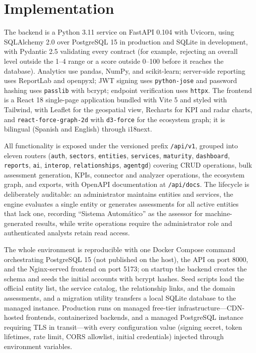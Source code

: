 \documentclass[runningheads]{llncs}
\begin{document}
\section{Implementation}
\label{sec:impl}

The backend is a Python 3.11 service on FastAPI 0.104 with Uvicorn, using
SQLAlchemy 2.0 over PostgreSQL 15 in production and SQLite in development,
with Pydantic 2.5 validating every contract (for example, rejecting an
overall level outside the 1--4 range or a score outside 0--100 before it
reaches the database). Analytics use pandas, NumPy, and scikit-learn;
server-side reporting uses ReportLab and openpyxl; JWT signing uses
\texttt{python-jose} and password hashing uses \texttt{passlib} with bcrypt;
endpoint verification uses \texttt{httpx}. The frontend is a React 18
single-page application bundled with Vite 5 and styled with Tailwind, with
Leaflet for the geospatial view, Recharts for KPI and radar charts, and
\texttt{react-force-graph-2d} with \texttt{d3-force} for the ecosystem graph;
it is bilingual (Spanish and English) through i18next.

All functionality is exposed under the versioned prefix \texttt{/api/v1},
grouped into eleven routers (\texttt{auth}, \texttt{sectors},
\texttt{entities}, \texttt{services}, \texttt{maturity}, \texttt{dashboard},
\texttt{reports}, \texttt{ai}, \texttt{interop}, \texttt{relationships},
\texttt{agentgd}) covering CRUD operations, bulk assessment generation, KPIs,
connector and analyzer operations, the ecosystem graph, and exports, with
OpenAPI documentation at \texttt{/api/docs}. The lifecycle is deliberately
auditable: an administrator maintains entities and services, the engine
evaluates a single entity or generates assessments for all active entities
that lack one, recording ``Sistema Autom\'atico'' as the assessor for
machine-generated results, while write operations require the administrator
role and authenticated analysts retain read access.

The whole environment is reproducible with one Docker Compose command
orchestrating PostgreSQL 15 (not published on the host), the API on port
8000, and the Nginx-served frontend on port 5173; on startup the backend
creates the schema and seeds the initial accounts with bcrypt hashes. Seed
scripts load the official entity list, the service catalog, the relationship
links, and the domain assessments, and a migration utility transfers a local
SQLite database to the managed instance. Production runs on managed
free-tier infrastructure---CDN-hosted frontends, containerized backends, and
a managed PostgreSQL instance requiring TLS in transit---with every
configuration value (signing secret, token lifetimes, rate limit, CORS
allowlist, initial credentials) injected through environment variables.
\end{document}
